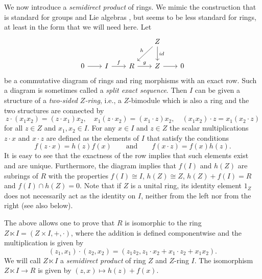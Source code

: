\documentclass[12pt,a4paper]{amsart}
\theoremstyle{definition}
\begin{document}
We now introduce a \emph{semidirect product} of rings. We mimic the construction that is standard for groups \cite{Ro95} and Lie algebras \cite{Pa07}, but seems to be less standard for rings, at least in the form that we will need here.
Let
$$\begin{tikzcd}[sep=20pt]
& & & Z & \\
0 & I & R & Z & 0
\arrow[from=2-1, to=2-2]
\arrow["f", from=2-2, to=2-3]
\arrow["g", from=2-3, to=2-4]
\arrow[from=2-4, to=2-5]
\arrow["h"', from=1-4, to=2-3]
\arrow["id", from=1-4, to=2-4]
\end{tikzcd}$$
be a commutative diagram of rings and ring morphisms with an exact row. Such a diagram is sometimes called a \emph{split exact sequence}.
Then $I$ can be given a structure of a \emph{two-sided $Z$-ring}, i.e., a $Z$-bimodule which is also a ring and the two structures are connected by
$$z \cdot (x_1x_2)=(z \cdot x_1)x_2, \quad
x_1(z \cdot x_2)=(x_1 \cdot z)x_2, \quad
(x_1x_2) \cdot z=x_1(x_2 \cdot z)$$
for all $z \in Z$ and $x_1,x_2 \in I$.
For any $x \in I$ and $z \in Z$ the scalar multiplications $z\cdot x$ and $x \cdot z$ are defined as the elements of $I$ that satisfy the conditions
$$f(z\cdot x)=h(z)f(x) \qquad \text{and} \qquad f(x\cdot z)=f(x)h(z).$$
It is easy to see that the exactness of the row implies that such elements exist and are unique.
Furthermore, the diagram implies that $f(I)$ and $h(Z)$ are subrings of $R$ with the properties $f(I) \cong I$, $h(Z) \cong Z$, $h(Z)+f(I)=R$ and $f(I) \cap h(Z)=0$.
Note that if $Z$ is a unital ring, its identity element $1_Z$ does not necessarily act as the identity on $I$, neither from the left nor from the right (see also below).

The above allows one to prove that $R$ is isomorphic to the ring $Z \ltimes I=(Z \times I,+,\cdot)$, where the addition is defined componentwise and the multiplication is given by
$$(z_1,x_1)\cdot(z_2,x_2)=(z_1z_2,z_1 \cdot x_2+x_1 \cdot z_2+x_1x_2).$$
We will call $Z \ltimes I$ a \emph{semidirect product} of ring $Z$ and $Z$-ring $I$.
The isomorphism $Z \ltimes I \to R$ is given by $(z,x) \mapsto h(z)+f(x)$.
\end{document}
